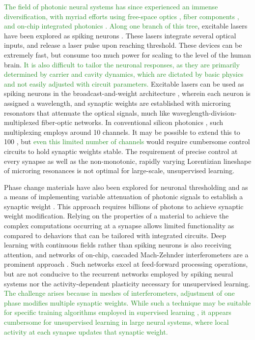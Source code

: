 \documentclass[twocolumn]{article}
\begin{document}
\textcolor{ForestGreen}{The field of photonic neural systems has since experienced an immense diversification, with myriad efforts using free-space optics \cite{habe2019}, fiber components \cite{prsh2017}, and on-chip integrated photonics \cite{shha2016,vame2014,tafe2019}. Along one branch of this tree}, excitable lasers have been explored as spiking neurons \cite{prsh2017}. These lasers integrate several optical inputs, and release a laser pulse upon reaching threshold. These devices can be extremely fast, but consume too much power for scaling to the level of the human brain. \textcolor{ForestGreen}{It is also difficult to tailor the neuronal responses, as they are primarily determined by carrier and cavity dynamics, which are dictated by basic physics and not easily adjusted with circuit parameters.} Excitable lasers can be used as spiking neurons in the broadcast-and-weight architecture \cite{tana20142}, wherein each neuron is assigned a wavelength, and synaptic weights are established with microring resonators that attenuate the optical signals, much like waveglength-division-multiplexed fiber-optic networks. In conventional silicon photonics \textcolor{ForestGreen}{\cite{li2005}}, such multiplexing employs around 10 channels. It may be possible to extend this to 100 \cite{prsh2011,tana20142}, but \textcolor{ForestGreen}{even this limited number of channels} would require cumbersome control circuits to hold synaptic weights stable. The requirement of precise control at every synapse as well as the non-monotonic, rapidly varying Lorentizian lineshape of microring resonances is not optimal for large-scale, unsupervised learning. 

Phase change materials have also been explored for neuronal thresholding \cite{chsa2018} and as a means of implementing variable attenuation of photonic signals to establish a synaptic weight \cite{chri2017}. This approach requires billions of photons to achieve synaptic weight modification. Relying on the properties of a material to achieve the complex computations occurring at a synapse allows limited functionality as compared to dehaviors that can be tailored with integrated circuits. Deep learning with continuous fields rather than spiking neurons is also receiving attention, and networks of on-chip, cascaded Mach-Zehnder interferometers are a prominent approach \cite{shha2016}. Such networks excel at feed-forward processing operations, but are not conducive to the recurrent networks employed by spiking neural systems nor the activity-dependent plasticity necessary for unsupervised learning. \textcolor{ForestGreen}{The challenge arises because in meshes of interferometers, adjustment of one phase modifies multiple synaptic weights. While such a technique may be suitable for specific training algorithms employed in supervised learning \cite{humi2018}, it appears cumbersome for unsupervised learning in large neural systems, where local activity at each synapse updates that synaptic weight.}
\end{document}
